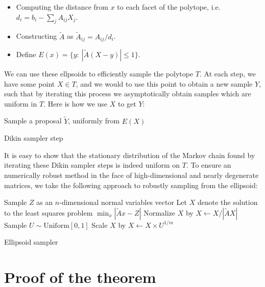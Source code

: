 \begin{itemize}
    \item Computing the distance from $x$ to each facet of the polytope, i.e. $d_i = b_i - \sum_j A_{ij} X_j$.
    \item Constructing $\tilde A$ as $\tilde A_{ij} = A_{ij} / d_i$.
    \item Define $E(x) = \{y:\ |\tilde A (X-y)|\leq 1\}$.  
\end{itemize}

We can use these ellpsoids to efficiently sample the polytope $T$.    At each step, we have some point $X\in T$, and we would to use this point to obtain a new sample $Y$, such that by iterating this process we asymptotically obtain samples which are uniform in $T$.  Here is how we use $X$ to get $Y$:

\begin{algorithm}[H]
 \vspace{.1in}
  Sample a proposal $\tilde Y$, uniformly from $E(X)$\;
 \caption{Dikin sampler step}
\end{algorithm}

It is easy to show that the stationary distribution of the Markov chain found by iterating these Dikin sampler steps is indeed uniform on $T$.  To ensure an numerically robust method in the face of high-dimensional and nearly degenerate matrices, we take the following approach to robustly sampling from the ellipsoid:

\begin{algorithm}[H]
 \vspace{.1in}
  Sample $Z$ as an $n$-dimensional normal variables vector\;
  Let $X$ denote the solution to the least squares problem $\min_x|\tilde Ax - Z|$\;
  Normalize $X$ by $X \gets X/|\tilde AX|$\;
  Sample $U \sim \mathrm{Uniform}[0,1]$\;
  Scale $X$ by $X \gets X \times U^{1/m}$\;
 \caption{Ellipsoid sampler}
\end{algorithm}


\section{Proof of the theorem}

